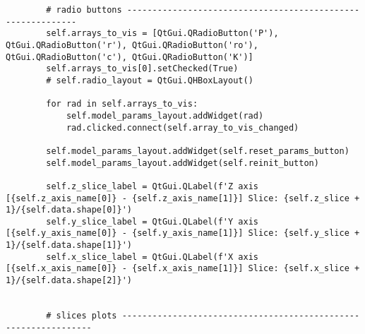 \documentclass[../main.tex]{subfiles}
\begin{document}
\begin{lstlisting}
        # radio buttons ------------------------------------------------------------
        self.arrays_to_vis = [QtGui.QRadioButton('P'), QtGui.QRadioButton('r'), QtGui.QRadioButton('ro'), QtGui.QRadioButton('c'), QtGui.QRadioButton('K')]
        self.arrays_to_vis[0].setChecked(True)
        # self.radio_layout = QtGui.QHBoxLayout()

        for rad in self.arrays_to_vis:
            self.model_params_layout.addWidget(rad)
            rad.clicked.connect(self.array_to_vis_changed)

        self.model_params_layout.addWidget(self.reset_params_button)
        self.model_params_layout.addWidget(self.reinit_button)

        self.z_slice_label = QtGui.QLabel(f'Z axis [{self.z_axis_name[0]} - {self.z_axis_name[1]}] Slice: {self.z_slice + 1}/{self.data.shape[0]}')
        self.y_slice_label = QtGui.QLabel(f'Y axis [{self.y_axis_name[0]} - {self.y_axis_name[1]}] Slice: {self.y_slice + 1}/{self.data.shape[1]}')
        self.x_slice_label = QtGui.QLabel(f'X axis [{self.x_axis_name[0]} - {self.x_axis_name[1]}] Slice: {self.x_slice + 1}/{self.data.shape[2]}')


        # slices plots ----------------------------------------------------------------
        

\end{lstlisting}
\end{document}
